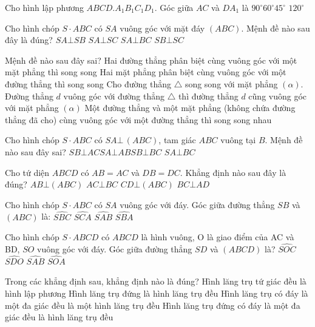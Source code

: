 \begin{ex}
Cho hình lập phương $ABCD.A_1B_1C_1D_1$. Góc giữa $AC$ và $DA_1$ là
	\choice
	{$90^\circ $}{$60^\circ $}{$45^\circ $}
	{$120^\circ $}
\end{ex}
\begin{ex}
	Cho hình chóp $S \cdot ABC$ có $SA$ vuông góc với mặt đáy $(ABC)$. Mệnh đề nào sau đây là đúng?
	\choice
	{$SA\bot SB$}
	{$SA\bot SC$}
	{$SA\bot BC$}
	{$SB\bot SC$}
\end{ex}
\begin{ex}
	Mệnh đề nào sau đây sai?
	\choice
	{Hai đường thẳng phân biệt cùng vuông góc với một mặt phẳng thì song song}
	{Hai mặt phẳng phân biệt cùng vuông góc với một đường thẳng thì song song}
	{Cho đường thẳng $\triangle $ song song với mặt phẳng $\left(\alpha\right)$. Đường thẳng $d$ vuông góc với đường thẳng $\triangle $ thì đường thẳng $d$ cũng vuông góc với mặt phẳng $\left(\alpha\right)$}
	{Một đường thẳng và một mặt phẳng (không chứa đường thẳng đã cho) cùng vuông góc với một đường thẳng thì song song nhau}
\end{ex}
\begin{ex}
	Cho hình chóp $S \cdot ABC$ có $SA\bot \,(ABC)$, tam giác $ABC$ vuông tại $B$. Mệnh đề nào sau đây sai?
	\choice
	{$SB\bot AC$}{$SA\bot AB$}{$SB\bot BC$}
	{$SA\bot BC$}
\end{ex}
\begin{ex}
	Cho tứ diện $ABCD$ có $AB=AC$ và $DB=DC$. Khẳng định nào sau đây là đúng?
	\choice
	{$AB\bot (ABC)$}
	{$AC\bot BC$}
	{$CD\bot (ABC)$}
	{$BC\bot AD$}
\end{ex}
\begin{ex}
	Cho hình chóp $S \cdot ABC$ có $SA$ vuông góc với đáy. Góc giữa đường thẳng $SB$ và $(ABC)$ là:
	\choice
	{$\widehat{SBC}$}
	{$\widehat{SCA}$}
	{$\widehat{SAB}$}
	{$\widehat{SBA}$}
\end{ex}
\begin{ex}
	Cho hình chóp $S \cdot ABCD$ có $ABCD$ là hình vuông, O là giao điểm của AC và BD, $SO$ vuông góc với đáy. Góc giữa đường thẳng $SD$ và $(ABCD)$ là?
	\choice
	{$\widehat{SOC}$}
	{$\widehat{SDO}$}
	{$\widehat{SAB}$}
	{$\widehat{SOA}$}
\end{ex}
\begin{ex}
	Trong các khẳng định sau, khẳng định nào là đúng?
	\choice
	{Hình lăng trụ tứ giác đều là hình lập phương}
	{Hình lăng trụ đứng là hình lăng trụ đều}
	{Hình lăng trụ có đáy là một đa giác đều là một hình lăng trụ đều}
	{Hình lăng trụ đứng có đáy là một đa giác đều là hình lăng trụ đều}
\end{ex}
